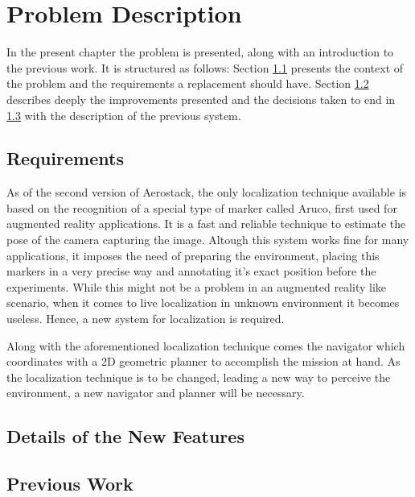 \chapter{Problem Description}

  In the present chapter the problem is presented, along with an introduction to the previous work. It is structured as follows: Section \ref{ch_2:sect:1} presents the context of the problem and the requirements a replacement should have. Section \ref{ch_2:sect:2} describes deeply the improvements presented and the decisions taken to end in \ref{ch_2:sect:3} with the description of the previous system.

  \section{Requirements} \label{ch_2:sect:1}

    As of the second version of Aerostack, the only localization technique available is based on the recognition of a special type of marker called Aruco, first used for augmented reality applications. It is a fast and reliable technique to estimate the pose of the camera capturing the image. Altough this system works fine for many applications, it imposes the need of preparing the environment, placing this markers in a very precise way and annotating it's exact position before the experiments. While this might not be a problem in an augmented reality like scenario, when it comes to live localization in unknown environment it becomes useless. Hence, a new system for localization is required.

    Along with the aforementioned localization technique comes the navigator which coordinates with a 2D geometric planner to accomplish the mission at hand. As the localization technique is to be changed, leading a new way to perceive the environment, a new navigator and planner will be necessary. 

  \section{Details of the New Features} \label{ch_2:sect:2}

  \section{Previous Work} \label{ch_2:sect:3}

